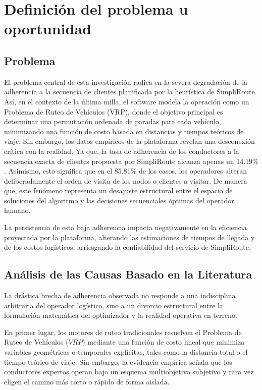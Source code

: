 \chapter{Definición del problema u oportunidad} %
\label{sec:problema} %

\section{Problema}
El problema central de esta investigación radica en la severa degradación de la adherencia a la secuencia de clientes planificada por la heurística de SimpliRoute. Así, en el contexto de la última milla, el software modela la operación como un Problema de Ruteo de Vehículos (VRP), donde el objetivo principal es determinar una permutación ordenada de paradas para cada vehículo, minimizando una función de costo basada en distancias y tiempos teóricos de viaje. Sin embargo, los datos empíricos de la plataforma revelan una desconexión crítica con la realidad. Ya que, la tasa de adherencia de los conductores a la secuencia exacta de clientes propuesta por SimpliRoute alcanza apenas un 14.19\% \cite{rubiocarrasco2025mejora}. Asimismo, esto significa que en el 85.81\% de los casos, los operadores alteran deliberadamente el orden de visita de los nodos o clientes a visitar. De manera que, este fenómeno representa un desajuste estructural entre el espacio de soluciones del algoritmo y las decisiones secuenciales óptimas del operador humano.

La persistencia de esta baja adherencia impacta negativamente en la eficiencia proyectada por la plataforma, alterando las estimaciones de tiempos de llegada y de los costos logísticos, arriesgando la confiabilidad del servicio de SimpliRoute.

\section{Análisis de las Causas Basado en la Literatura}

La drástica brecha de adherencia observada no responde a una indisciplina arbitraria del operador logístico, sino a un divorcio estructural entre la formulación matemática del optimizador y la realidad operativa en terreno. 

En primer lugar, los motores de ruteo tradicionales resuelven el Problema de Ruteo de Vehículos ($VRP$) mediante una función de costo lineal que minimiza variables geométricas o temporales explícitas, tales como la distancia total o el tiempo teórico de viaje. Sin embargo, la evidencia empírica señala que los conductores expertos operan bajo un esquema multiobjetivo subjetivo y rara vez eligen el camino más corto o rápido de forma aislada. 


